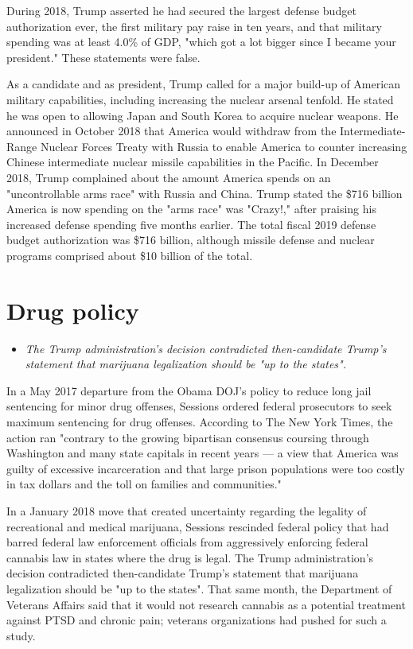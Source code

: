 During 2018, Trump asserted he had secured the largest defense budget
authorization ever, the first military pay raise in ten years, and that
military spending was at least 4.0\% of GDP, "which got a lot bigger
since I became your president." These statements were false.

As a candidate and as president, Trump called for a major build-up of
American military capabilities, including increasing the nuclear arsenal
tenfold. He stated he was open to allowing Japan and South Korea to
acquire nuclear weapons. He announced in October 2018 that America would
withdraw from the Intermediate-Range Nuclear Forces Treaty with Russia
to enable America to counter increasing Chinese intermediate nuclear
missile capabilities in the Pacific. In December 2018, Trump complained
about the amount America spends on an "uncontrollable arms race" with
Russia and China. Trump stated the \$716 billion America is now spending
on the "arms race" was "Crazy!," after praising his increased defense
spending five months earlier. The total fiscal 2019 defense budget
authorization was \$716 billion, although missile defense and nuclear
programs comprised about \$10 billion of the total.

\section{Drug policy}\label{drug-policy}

\begin{itemize}
\item
  \emph{The Trump administration's decision contradicted then-candidate
  Trump's statement that marijuana legalization should be "up to the
  states".}
\end{itemize}

In a May 2017 departure from the Obama DOJ's policy to reduce long jail
sentencing for minor drug offenses, Sessions ordered federal prosecutors
to seek maximum sentencing for drug offenses. According to The New York
Times, the action ran "contrary to the growing bipartisan consensus
coursing through Washington and many state capitals in recent years ---
a view that America was guilty of excessive incarceration and that large
prison populations were too costly in tax dollars and the toll on
families and communities."

In a January 2018 move that created uncertainty regarding the legality
of recreational and medical marijuana, Sessions rescinded federal policy
that had barred federal law enforcement officials from aggressively
enforcing federal cannabis law in states where the drug is legal. The
Trump administration's decision contradicted then-candidate Trump's
statement that marijuana legalization should be "up to the states". That
same month, the Department of Veterans Affairs said that it would not
research cannabis as a potential treatment against PTSD and chronic
pain; veterans organizations had pushed for such a study.

